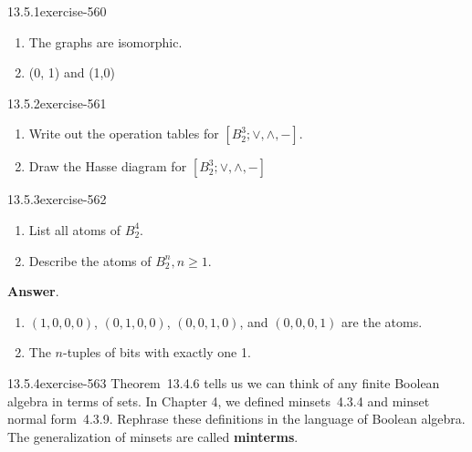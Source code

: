 \documentclass[twoside,10pt,]{book}
\newcommand{\terminology}[1]{\textbf{#1}}
\numberwithin{equation}{section}
\begin{document}
\begin{divisionsolution}{13.5.1}{}{exercise-560}
\begin{enumerate}[label=(\alph*)]
\begin{equation*}
\begin{array}{lc}
\begin{array}{c|c}
u & \overset{\pmb{\_}}{u} \\
\hline
(0,0) & (1,1) \\
(0,1) &(1,0) \\
(1,0) &(0,1) \\
(1,1) &(0,0) \\
\end{array}
\\
\end{array}
\end{equation*}
%
\item\hypertarget{li-2258}{}\hypertarget{p-4973}{}%
The graphs are isomorphic.%
\item\hypertarget{li-2259}{}\hypertarget{p-4974}{}%
(0, 1) and (1,0)%
\end{enumerate}
%
\end{divisionsolution}%
\begin{divisionsolution}{13.5.2}{}{exercise-561}%
\hypertarget{p-4975}{}%
\leavevmode%
\begin{enumerate}[label=(\alph*)]
\item\hypertarget{li-2260}{}\hypertarget{p-4976}{}%
Write out the operation tables for \(\left[B_2^3; \lor , \land, - \right].\)%
\item\hypertarget{li-2261}{}\hypertarget{p-4977}{}%
Draw the Hasse diagram for \(\left[B_2^3; \lor , \land , - \right]\)%
\end{enumerate}
%
\end{divisionsolution}%
\begin{divisionsolution}{13.5.3}{}{exercise-562}%
\hypertarget{p-4978}{}%
\leavevmode%
\begin{enumerate}[label=(\alph*)]
\item\hypertarget{li-2262}{}\hypertarget{p-4979}{}%
List all atoms of \(B_2^4\).%
\item\hypertarget{li-2263}{}\hypertarget{p-4980}{}%
Describe the atoms of \(B_2^n, n \geq 1\).%
\end{enumerate}
%
\par\smallskip%
\noindent\textbf{Answer}.\quad%
\hypertarget{p-4981}{}%
\leavevmode%
\begin{enumerate}[label=(\alph*)]
\item\hypertarget{li-2264}{}\hypertarget{p-4982}{}%
\((1, 0, 0, 0)\), \((0, 1, 0, 0)\), \((0, 0, 1, 0)\), and \((0, 0, 0, 1)\) are the atoms.%
\item\hypertarget{li-2265}{}\hypertarget{p-4983}{}%
The \(n\)-tuples of bits with exactly one 1.%
\end{enumerate}
%
\end{divisionsolution}%
\begin{divisionsolution}{13.5.4}{}{exercise-563}%
\hypertarget{p-4984}{}%
Theorem~13.4.6 tells us we can think of any finite Boolean algebra in terms of sets. In Chapter 4,  we defined  minsets~4.3.4 and minset normal form~4.3.9.  Rephrase these definitions in the language of Boolean algebra. The generalization of minsets are called \terminology{minterms}.%
\end{divisionsolution}%
\end{document}
